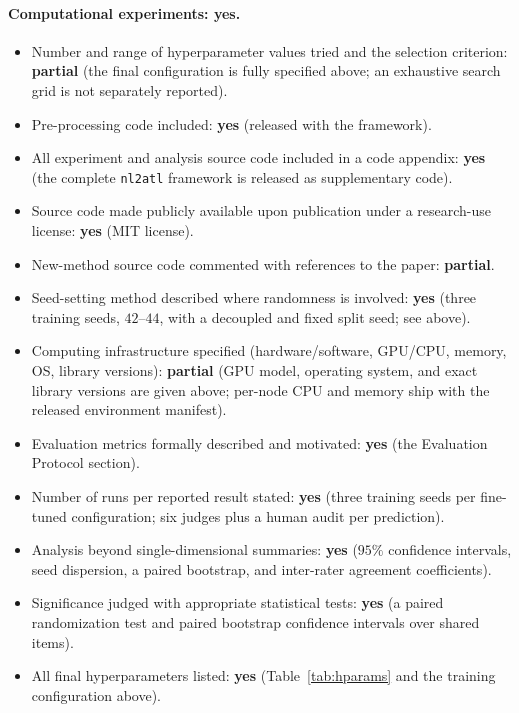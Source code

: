 \documentclass[letterpaper]{article}
\begin{document}
\paragraph{Computational experiments: yes.}
\begin{itemize}[leftmargin=1.2em,itemsep=2pt]
  \item Number and range of hyperparameter values tried and the selection criterion: \textbf{partial} (the final configuration is fully specified above; an exhaustive search grid is not separately reported).
  \item Pre-processing code included: \textbf{yes} (released with the framework).
  \item All experiment and analysis source code included in a code appendix: \textbf{yes} (the complete \texttt{nl2atl} framework is released as supplementary code).
  \item Source code made publicly available upon publication under a research-use license: \textbf{yes} (MIT license).
  \item New-method source code commented with references to the paper: \textbf{partial}.
  \item Seed-setting method described where randomness is involved: \textbf{yes} (three training seeds, $42$--$44$, with a decoupled and fixed split seed; see above).
  \item Computing infrastructure specified (hardware/software, GPU/CPU, memory, OS, library versions): \textbf{partial} (GPU model, operating system, and exact library versions are given above; per-node CPU and memory ship with the released environment manifest).
  \item Evaluation metrics formally described and motivated: \textbf{yes} (the Evaluation Protocol section).
  \item Number of runs per reported result stated: \textbf{yes} (three training seeds per fine-tuned configuration; six judges plus a human audit per prediction).
  \item Analysis beyond single-dimensional summaries: \textbf{yes} ($95\%$ confidence intervals, seed dispersion, a paired bootstrap, and inter-rater agreement coefficients).
  \item Significance judged with appropriate statistical tests: \textbf{yes} (a paired randomization test and paired bootstrap confidence intervals over shared items).
  \item All final hyperparameters listed: \textbf{yes} (Table~\ref{tab:hparams} and the training configuration above).
\end{itemize}
\end{document}
